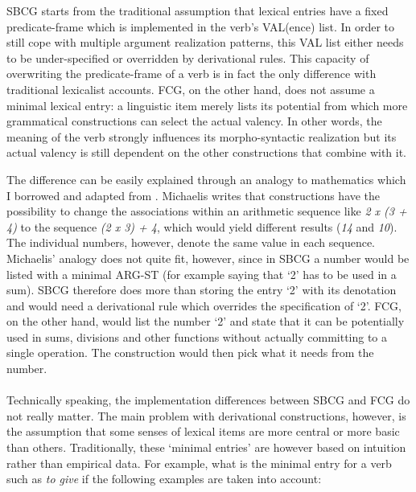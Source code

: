 SBCG starts from the traditional assumption that lexical entries have a fixed predicate-frame which is implemented in the verb's VAL(ence) list. In order to still cope with multiple argument realization patterns, this VAL list either needs to be under-specified or overridden by derivational rules. This capacity of overwriting the predicate-frame of a verb is in fact the only difference with traditional lexicalist accounts. FCG, on the other hand, does not assume a minimal lexical entry: a linguistic item merely lists its potential from which more grammatical constructions can select the actual valency. In other words, the meaning of the verb strongly influences its morpho-syntactic realization but its actual valency is still dependent on the other constructions that combine with it.

The difference can be easily explained through an analogy to mathematics which I borrowed and adapted from \citet{michaelis06complementation}. Michaelis writes that constructions have the possibility to change the associations within an arithmetic sequence like {\em 2 x (3 + 4)} to the sequence {\em (2 x 3) + 4}, which would yield different results ({\em 14} and {\em 10}). The individual numbers, however, denote the same value in each sequence. Michaelis' analogy does not quite fit, however, since in SBCG a number would be listed with a minimal ARG-ST (for example saying that `2' has to be used in a sum). SBCG therefore does more than storing the entry `2' with its denotation and would need a derivational rule which overrides the specification of `2'. FCG, on the other hand, would list the number `2' and state that it can be potentially used in sums, divisions and other functions without actually committing to a single operation. The construction would then pick what it needs from the number.
\\
\\
 Technically speaking, the implementation differences between SBCG and FCG do not really matter. The main problem with derivational constructions, however, is the assumption that some senses of lexical items are more central or more basic than others. Traditionally, these `minimal entries' are however based on intuition rather than empirical data. For example, what is the minimal entry for a verb such as {\em to give} if the following examples are taken into account:

